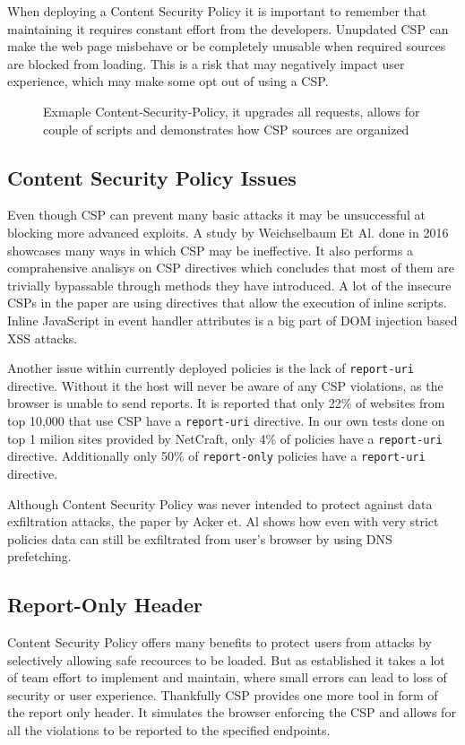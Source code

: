 When deploying a Content Security Policy it is important to remember that maintaining it requires constant effort from the developers.
Unupdated CSP can make the web page misbehave or be completely unusable when required sources are blocked from loading.
This is a risk that may negatively impact user experience, which may make some opt out of using a CSP.

\begin{figure}[h]
	
	\caption{Exmaple Content-Security-Policy, it upgrades all requests, allows for couple of scripts and demonstrates how CSP sources are organized}
\end{figure}


\subsection{Content Security Policy Issues}
Even though CSP can prevent many basic attacks it may be unsuccessful at blocking more advanced exploits.
A study by Weichselbaum Et Al. done in 2016 showcases many ways in which CSP may be ineffective. \cite{weichselbaum2016csp}
It also performs a comprahensive analisys on CSP directives which concludes that most of them are trivially bypassable through methods they have introduced.
A lot of the insecure CSPs in the paper are using directives that allow the execution of inline scripts.
Inline JavaScript in event handler attributes is a big part of DOM injection based XSS attacks.

Another issue within currently deployed policies is the lack of \texttt{report-uri} directive.
Without it the host will never be aware of any CSP violations, as the browser is unable to send reports.
It is reported that only 22\% of websites from top 10,000 that use CSP have a \texttt{report-uri} directive.
In our own tests done on top 1 milion sites provided by NetCraft, only 4\% of policies have a \texttt{report-uri} directive.
Additionally only 50\% of \texttt{report-only} policies have a \texttt{report-uri} directive.

Although Content Security Policy was never intended to protect against data exfiltration attacks, 
the paper by Acker et. Al shows how even with very strict policies data can still be exfiltrated from user's browser by using DNS prefetching.


\subsection{Report-Only Header}
Content Security Policy offers many benefits to protect users from attacks by selectively allowing safe recources to be loaded.
But as established it takes a lot of team effort to implement and maintain, where small errors can lead to loss of security or user experience.
Thankfully CSP provides one more tool in form of the report only header.
It simulates the browser enforcing the CSP and allows for all the violations to be reported to the specified endpoints.

